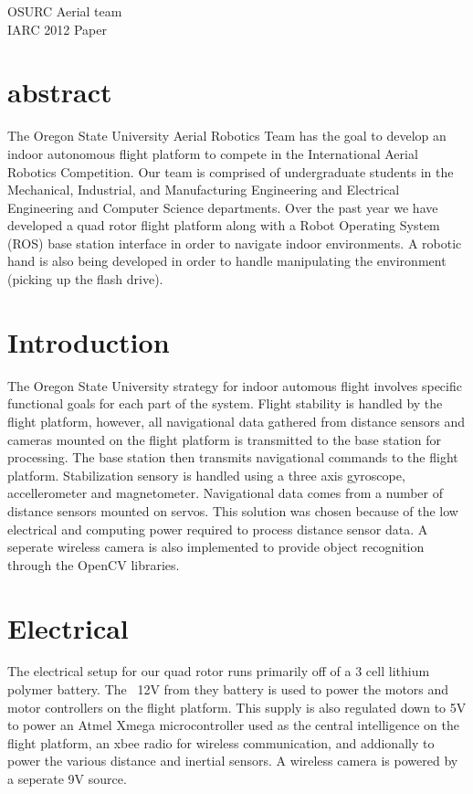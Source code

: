 \documentclass[12pt,letterpaper]{article}
\begin{document}
\begin{titlepage}
    \vspace*{4cm}
    \begin{center}
    {\huge
        OSURC Aerial team\\[1cm]
    }
    {\large
	IARC 2012 Paper\\
    }

    \end{center}
    \vfill
\end{titlepage}
\section{abstract}
The Oregon State University Aerial Robotics Team has the goal to develop
an indoor autonomous flight platform to compete in the International Aerial
Robotics Competition. Our team is comprised of undergraduate students in the
Mechanical, Industrial, and Manufacturing Engineering and Electrical Engineering
and Computer Science departments. Over the past year we have developed a quad
rotor flight platform along with a Robot Operating System (ROS) base station
interface in order to navigate indoor environments. A robotic hand is also
being developed in order to handle manipulating the environment (picking up the
flash drive).

\section{Introduction}
	The Oregon State University strategy for indoor automous flight involves
specific functional goals for each part of the system. Flight stability is
handled by the flight platform, however, all navigational data gathered from
distance sensors and cameras mounted on the flight platform is transmitted to
the base station for processing. The base station then transmits navigational
commands to the flight platform.
	Stabilization sensory is handled using a three axis gyroscope, 
accellerometer and magnetometer. Navigational data comes from a number of
distance sensors mounted on servos. This solution was chosen because of the
low electrical and computing power required to process distance sensor data.
A seperate wireless camera is also implemented to provide object recognition
through the OpenCV libraries.

\section{Electrical}
The electrical setup for our quad rotor runs primarily off of a 3 cell
lithium polymer battery. The ~12V from they battery is used to power the motors
and motor controllers on the flight platform. This supply is also regulated down
to 5V to power an Atmel Xmega microcontroller used as the central intelligence
on the flight platform, an xbee radio for wireless communication, and 
addionally to power the various distance and inertial sensors. A wireless camera
is powered by a seperate 9V source.
\end{document}
